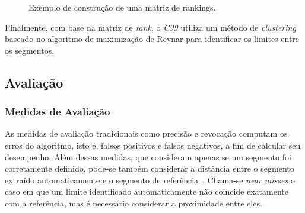 \begin{figure}[!h]
	\centering     %

	
	\caption{Exemplo de construção de uma matriz de rankings.%
	}
	\label{fig:exemplomatrixrank}
\end{figure}



Finalmente, com base na matriz de \textit{rank}, o \textit{C99} utiliza um método de \textit{clustering} baseado no algoritmo de maximização de Reynar
para identificar os limites entre os segmentos. 





\subsection{Avaliação}





\subsubsection{Medidas de Avaliação}

As medidas de avaliação tradicionais como precisão e revocação 
computam os erros do algoritmo, isto é, falsos positivos e falsos negativos, a fim de calcular seu desempenho. 
Além dessas medidas, que consideram apenas se um segmento foi corretamente definido, pode-se também considerar a distância entre o segmento extraído automaticamente e o segmento de referência~\cite{Kern2009}. Chama-se \textit{near misses} o caso em que um limite identificado automaticamente não coincide exatamente com a referência, mas é necessário considerar a proximidade entre eles.



